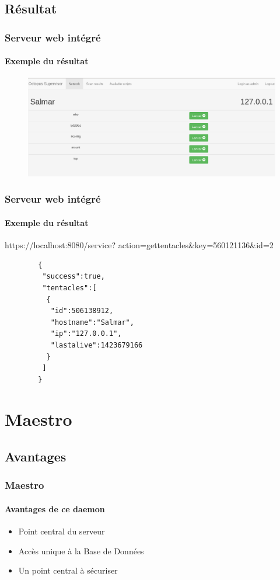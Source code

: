 \subsection{Résultat}
\begin{frame}
	\frametitle{Serveur web intégré}
	\framesubtitle{Exemple du résultat}
	\begin{figure}[!h]
		\begin{center}
			\includegraphics[width=\textwidth]{images/screen_web.png}
		\end{center}
	\end{figure}
\end{frame}
\begin{frame}[fragile]
	\frametitle{Serveur web intégré}
	\framesubtitle{Exemple du résultat}
	https://localhost:8080/service?
	   action=gettentacles\&key=560121136\&id=2
	\begin{verbatim}
		{
		 "success":true,
		 "tentacles":[
		  {
		   "id":506138912,
		   "hostname":"Salmar",
		   "ip":"127.0.0.1",
		   "lastalive":1423679166
		  }
		 ]
		}
	\end{verbatim} 
\end{frame}

\section{Maestro}
\subsection{Avantages}
\begin{frame}
	\frametitle{Maestro}
	\framesubtitle{Avantages de ce daemon}
	\begin{itemize}
		\item Point central du serveur
		\item Accès unique à la Base de Données
		\item Un point central à sécuriser
	\end{itemize}
\end{frame}

